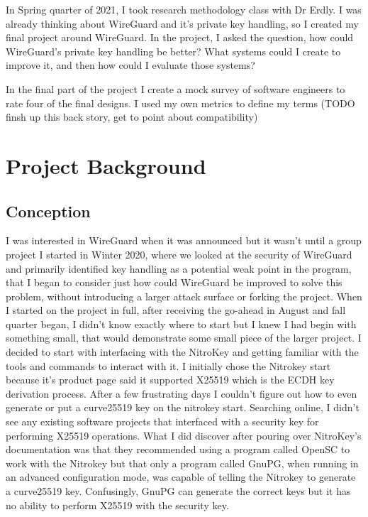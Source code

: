\documentclass [11pt, proquest] {uwthesis}[2020/02/24]
\begin{document}
In Spring quarter of 2021, I took research methodology class with Dr Erdly. I was already thinking about WireGuard and it's private key handling, so I created my final project around WireGuard. In the project, I asked the question, how could WireGuard's private key handling be better? What systems could I create to improve it, and then how could I evaluate those systems?  

In the final part of the project I create a mock survey of software engineers to rate four of the final designs. I used my own metrics to define my terms (TODO finsh up this back story, get to point about compatibility)

\chapter {Project Background}

\section {Conception}
I was interested in WireGuard when it was announced but it wasn't until a group project I started in Winter 2020, where we looked at the security of WireGuard and primarily identified key handling as a potential weak point in the program, that I began to consider just how could WireGuard be improved to solve this problem, without introducing a larger attack surface or forking the project. 
When I started on the project in full, after receiving the go-ahead in August and fall quarter began, I didn't know exactly where to start but I knew I had begin with something small, that would demonstrate some small piece of the larger project.
I decided to start with interfacing with the NitroKey and getting familiar with the tools and commands to interact with it. I initially chose the Nitrokey start because it's product page said it supported X25519\cite{noauthor_nitrokey_nodate} which is the ECDH key derivation process. After a few frustrating days I couldn't figure out how to even generate or put a curve25519 key on the nitrokey start. Searching online, I didn't see any existing software projects that interfaced with a security key for performing X25519 operations. What I did discover after pouring over NitroKey's documentation was that they recommended using a program called OpenSC to work with the Nitrokey but that only a program called GnuPG, when running in an advanced configuration mode, was capable of telling the Nitrokey to generate a curve25519 key. Confusingly, GnuPG can generate the correct keys but it has no ability to perform X25519 with the security key.
\end{document}
